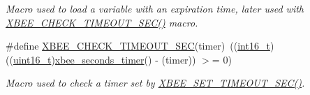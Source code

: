\begin{DoxyCompactItemize}
\begin{DoxyCompactList}\small\item\em Macro used to load a variable with an expiration time, later used with \hyperlink{group__hal_ga858c3c1caa899efd6af9ee8a0fe09246}{X\-B\-E\-E\-\_\-\-C\-H\-E\-C\-K\-\_\-\-T\-I\-M\-E\-O\-U\-T\-\_\-\-S\-E\-C()} macro. \end{DoxyCompactList}\item 
\#define \hyperlink{group__hal_ga858c3c1caa899efd6af9ee8a0fe09246}{X\-B\-E\-E\-\_\-\-C\-H\-E\-C\-K\-\_\-\-T\-I\-M\-E\-O\-U\-T\-\_\-\-S\-E\-C}(timer)~((\hyperlink{group__hal_ga2140805d08462d474b82ddc8d1c2f3e6}{int16\-\_\-t})((\hyperlink{group__hal_ga5a8b2dc9e45a9ee81a94ef304fb62505}{uint16\-\_\-t})\hyperlink{group__hal_ga5c1a8bccd41acf1d7264a75698077749}{xbee\-\_\-seconds\-\_\-timer}() -\/ (timer)) $>$= 0)
\begin{DoxyCompactList}\small\item\em Macro used to check a timer set by \hyperlink{group__hal_ga6adb5c9e19c84a261c569ff4d77d1170}{X\-B\-E\-E\-\_\-\-S\-E\-T\-\_\-\-T\-I\-M\-E\-O\-U\-T\-\_\-\-S\-E\-C()}. \end{DoxyCompactList}\end{DoxyCompactItemize}
